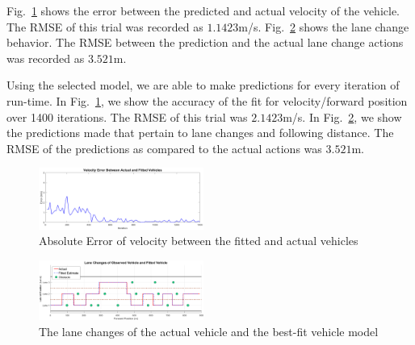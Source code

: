\documentclass[letterpaper, 10 pt, conference]{ieeeconf}  %
\begin{document}
Fig.~\ref{fig:fwd} shows the error between the predicted and actual velocity of the vehicle. The RMSE of this trial was recorded as $1.1423$m/s.
Fig.~\ref{fig:lanchan} shows the lane change behavior. The RMSE between the prediction and the actual lane change actions was recorded as $3.521$m.

Using the selected model, we are able to make predictions for every iteration of run-time. In Fig.~\ref{fig:fwd}, we show the accuracy of the fit for velocity/forward position over 1400 iterations. The RMSE of this trial was $2.1423$m/s. 
In Fig.~\ref{fig:lanchan}, we show the predictions made that pertain to lane changes and following distance. The RMSE of the predictions as compared to the actual actions was $3.521$m. 


\begin{figure}[ht]
    \includegraphics[width=0.48\textwidth]{fig/fiterroravg.png}
    \caption{Absolute Error of velocity between the fitted and actual vehicles} \label{fig:fwd}
\end{figure}

\begin{figure}[ht]
    \includegraphics[width=0.48\textwidth]{fig/lanefit.png}
    \caption{The lane changes of the actual vehicle and the best-fit vehicle model} \label{fig:lanchan}
\end{figure}
\end{document}
